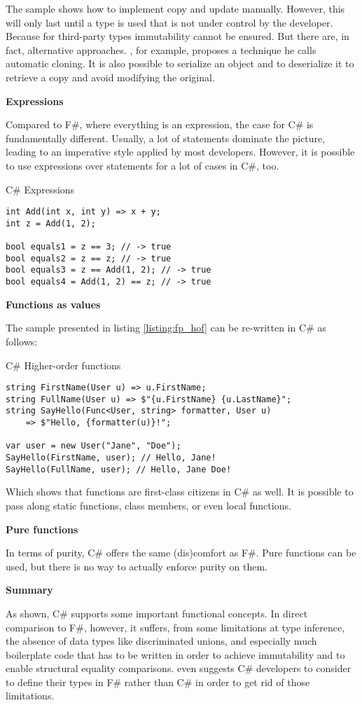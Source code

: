 The sample shows how to implement copy and update manually. However, this will only last until a type is used that is not under control by the developer. Because for third-party types immutability cannot be ensured. But there are, in fact, alternative approaches. \cite[173]{sturm_functional_2011}, for example, proposes a technique he calls automatic cloning. It is also possible to serialize an object and to deserialize it to retrieve a copy and avoid modifying the original. 

\textbf{Expressions}

Compared to F\#, where everything is an expression, the case for C\# is fundamentally different. Usually, a lot of statements dominate the picture, leading to an imperative style applied by most developers. However, it is possible to use expressions over statements for a lot of cases in C\#, too.

\begin{listing}[H]
\caption{C\# Expressions}
\begin{verbatim}
int Add(int x, int y) => x + y;
int z = Add(1, 2);

bool equals1 = z == 3; // -> true
bool equals2 = z == z; // -> true
bool equals3 = z == Add(1, 2); // -> true
bool equals4 = Add(1, 2) == z; // -> true
\end{verbatim}
\end{listing}

\textbf{Functions as values}

The sample presented in listing \ref{listing:fp_hof} can be re-written in C\# as follows:

\begin{listing}[H]
\caption{C\# Higher-order functions}
\begin{verbatim}
string FirstName(User u) => u.FirstName;
string FullName(User u) => $"{u.FirstName} {u.LastName}";
string SayHello(Func<User, string> formatter, User u) 
    => $"Hello, {formatter(u)}!";

var user = new User("Jane", "Doe");
SayHello(FirstName, user); // Hello, Jane!
SayHello(FullName, user); // Hello, Jane Doe!
\end{verbatim}
\end{listing}

Which shows that functions are first-class citizens in C\# as well. It is possible to pass along static functions, class members, or even local functions.

\textbf{Pure functions}

In terms of purity, C\# offers the same (dis)comfort as F\#. Pure functions can be used, but there is no way to actually enforce purity on them.

\textbf{Summary}

As shown, C\# supports some important functional concepts. In direct comparison to F\#, however, it suffers, from some limitations at type inference, the absence of data types like discriminated unions, and especially much boilerplate code that has to be written in order to achieve immutability and to enable structural equality comparisons. \cite[216]{buonanno_functional_2018} even suggests C\# developers to consider to define their types in F\# rather than C\# in order to get rid of those limitations.